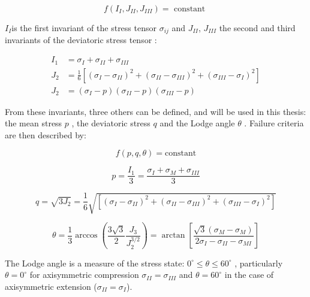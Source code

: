 \begin{equation}\label{eq2:fijjconst}
    f\left(I_{I}, J_{II}, J_{III} \right)=\text { constant }
\end{equation}

$I_{I}$is the first invariant of the stress tensor $\sigma_{ij}$ and $J_{II}$, $J_{III}$ the second and third invariants of the deviatoric stress tensor  : 

\begin{align}
   I_1 &= \sigma_{I} + \sigma_{II} + \sigma_{III} \\
   J_{2}&=\frac{1}{6}\left[\left(\sigma_{I}-\sigma_{I I}\right)^{2}+\left(\sigma_{I I}-\sigma_{I I I}\right)^{2}+\left(\sigma_{I I I}-\sigma_{I}\right)^{2}\right]\\
   J_{2}&=\left(\sigma_{I}-p\right)\left(\sigma_{I I}-p\right)\left(\sigma_{III}-p\right)
\end{align}

From these invariants, three others can be defined, and will be used in this thesis: the mean stress $p$ , the deviatoric stress $q$ and the Lodge angle $\theta$ . Failure criteria are then described by:

\begin{equation} \label{eq2:fpqtconst}
    f(p,q,\theta) = \text{constant}
\end{equation}

\begin{equation} \label{eq2:peq}
    p=\frac{I_{1}}{3}=\frac{\sigma_{I}+\sigma_{M}+\sigma_{III}}{3}
\end{equation}

\begin{equation}\label{eq2:qeq}
    q=\sqrt{3 J_{2}}=\frac{1}{6} \sqrt{\left[\left(\sigma_{I}-\sigma_{II}\right)^{2}+\left(\sigma_{II}-\sigma_{III}\right)^{2}+\left(\sigma_{III}-\sigma_{I}\right)^{2}\right]}
\end{equation}

\begin{equation}
    \theta=\frac{1}{3} \arccos \left(\frac{3 \sqrt{3}}{2} \frac{J_{3}}{J_{2}^{3 / 2}}\right)=\arctan \left[\frac{\sqrt{3}\left(\sigma_{M}-\sigma_{M}\right)}{2 \sigma_{I}-\sigma_{I I}-\sigma_{M I}}\right]
\end{equation}

The Lodge angle is a measure of the stress state: $0^{\circ} \leq \theta \leq 60^{\circ}$ , particularly $\theta = 0^{\circ}$  for axisymmetric compression $\sigma_{II} = \sigma_{III} $ and $\theta = 60^{\circ}$ in the case of axisymmetric extension ($\sigma_{II} = \sigma_{I} $). 

